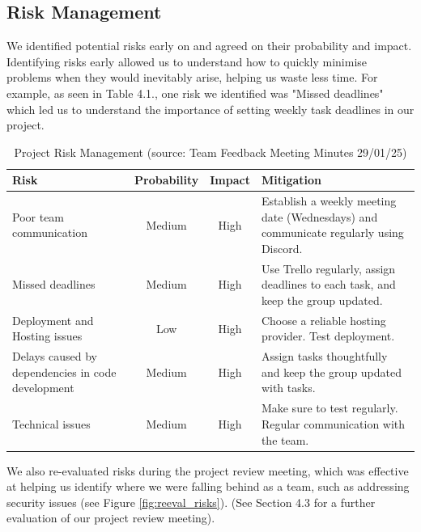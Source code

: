 \subsection{Risk Management}
We identified potential risks early on and agreed on their probability and impact. Identifying risks early allowed us to understand how to quickly minimise problems when they would inevitably arise, helping us waste less time. For example, as seen in Table 4.1., one risk we identified was "Missed deadlines" which led us to understand the importance of setting weekly task deadlines in our project.

\begin{table}[H]
    \centering
    \caption{Project Risk Management (source: Team Feedback Meeting Minutes 29/01/25)}
    \label{table:project_risk}
    \begin{tabular}{|p{5cm}|c|c|p{6cm}|}
        \hline
        \textbf{Risk} & \textbf{Probability} & \textbf{Impact} & \textbf{Mitigation} \\
        \hline
        Poor team communication & Medium & High & Establish a weekly meeting date (Wednesdays) and communicate regularly using Discord. \\
        \hline
        Missed deadlines & Medium & High & Use Trello regularly, assign deadlines to each task, and keep the group updated. \\
        \hline
        Deployment and Hosting issues & Low & High & Choose a reliable hosting provider. Test deployment. \\
        \hline
        Delays caused by dependencies in code development & Medium & High & Assign tasks thoughtfully and keep the group updated with tasks. \\
        \hline
        Technical issues & Medium & High & Make sure to test regularly. Regular communication with the team. \\
        \hline
    \end{tabular}
\end{table}

We also re-evaluated risks during the project review meeting, which was effective at helping us identify where we were falling behind as a team, such as addressing security issues (see Figure \ref{fig:reeval_risks}). (See Section 4.3 for a further evaluation of our project review meeting).

